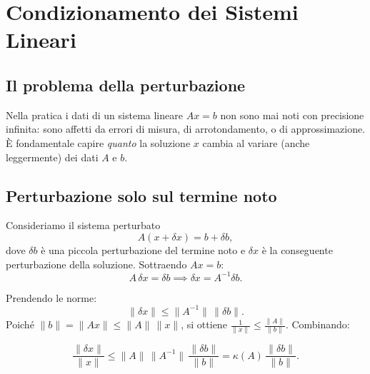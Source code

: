 \chapter{Condizionamento dei Sistemi Lineari}
\label{ch:condizionamento}

\section{Il problema della perturbazione}

Nella pratica i dati di un sistema lineare $Ax = b$ non sono mai noti con precisione
infinita: sono affetti da errori di misura, di arrotondamento, o di approssimazione.
È fondamentale capire \emph{quanto} la soluzione $x$ cambia al variare (anche
leggermente) dei dati $A$ e $b$.

\section{Perturbazione solo sul termine noto}
\label{sec:pert_b}

Consideriamo il sistema perturbato
\begin{equation}
  A(x + \delta x) = b + \delta b,
  \label{eq:pert_b}
\end{equation}
dove $\delta b$ è una piccola perturbazione del termine noto e $\delta x$ è la
conseguente perturbazione della soluzione. Sottraendo $Ax = b$:
\begin{equation}
  A\,\delta x = \delta b \implies \delta x = A^{-1}\delta b.
\end{equation}

Prendendo le norme:
\begin{equation}
  \|\delta x\| \leq \|A^{-1}\|\,\|\delta b\|.
  \label{eq:bound_deltax}
\end{equation}
Poiché $\|b\| = \|Ax\| \leq \|A\|\,\|x\|$, si ottiene $\frac{1}{\|x\|} \leq
\frac{\|A\|}{\|b\|}$. Combinando:

\begin{equation}
  \frac{\|\delta x\|}{\|x\|} \leq \|A\|\,\|A^{-1}\|\,\frac{\|\delta b\|}{\|b\|}
  = \kappa(A)\,\frac{\|\delta b\|}{\|b\|}.
  \label{eq:cond_b}
\end{equation}

